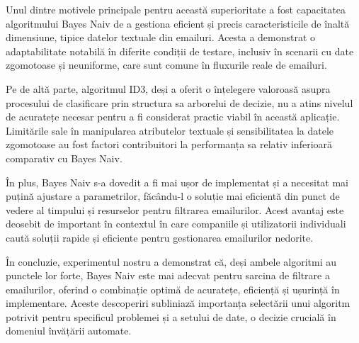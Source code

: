 \documentclass{article}
\begin{document}
Unul dintre motivele principale pentru această superioritate a fost capacitatea algoritmului Bayes Naiv de a gestiona eficient și precis caracteristicile de înaltă dimensiune, tipice datelor textuale din emailuri. Acesta a demonstrat o adaptabilitate notabilă în diferite condiții de testare, inclusiv în scenarii cu date zgomotoase și neuniforme, care sunt comune în fluxurile reale de emailuri.

Pe de altă parte, algoritmul ID3, deși a oferit o înțelegere valoroasă asupra procesului de clasificare prin structura sa arborelui de decizie, nu a atins nivelul de acuratețe necesar pentru a fi considerat practic viabil în această aplicație. Limitările sale în manipularea atributelor textuale și sensibilitatea la datele zgomotoase au fost factori contribuitori la performanța sa relativ inferioară comparativ cu Bayes Naiv.

În plus, Bayes Naiv s-a dovedit a fi mai ușor de implementat și a necesitat mai puțină ajustare a parametrilor, făcându-l o soluție mai eficientă din punct de vedere al timpului și resurselor pentru filtrarea emailurilor. Acest avantaj este deosebit de important în contextul în care companiile și utilizatorii individuali caută soluții rapide și eficiente pentru gestionarea emailurilor nedorite.

În concluzie, experimentul nostru a demonstrat că, deși ambele algoritmi au punctele lor forte, Bayes Naiv este mai adecvat pentru sarcina de filtrare a emailurilor, oferind o combinație optimă de acuratețe, eficiență și ușurință în implementare. Aceste descoperiri subliniază importanța selectării unui algoritm potrivit pentru specificul problemei și a setului de date, o decizie crucială în domeniul învățării automate.

    
% 
% 
\end{document}
